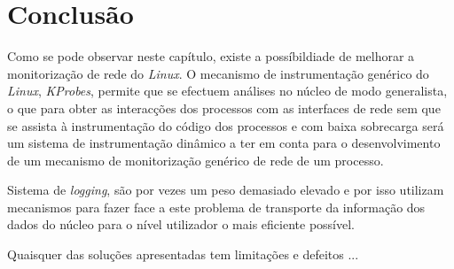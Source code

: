 
\section{Conclusão}

Como se pode observar neste capítulo, existe a possíbildiade de melhorar a monitorização de rede do \textit{Linux}.
O mecanismo de instrumentação genérico do \textit{Linux}, \textit{KProbes}, permite que se efectuem análises no núcleo de modo generalista, o que para obter as interacções dos processos com as interfaces de rede sem que se assista à instrumentação do código dos processos e com baixa sobrecarga será um sistema de instrumentação dinâmico a ter em conta para o desenvolvimento de um mecanismo de monitorização genérico de rede de um processo.

Sistema de \textit{logging}, são por vezes um peso demasiado elevado e por isso utilizam mecanismos para fazer face a este problema de transporte da informação dos dados do núcleo para o nível utilizador o mais eficiente possível.


Quaisquer das soluções apresentadas tem limitações e defeitos ...
